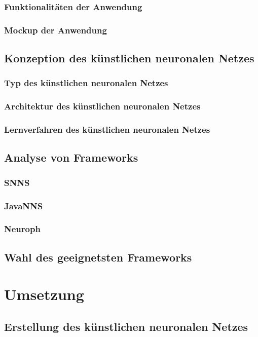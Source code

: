 \documentclass[11pt,a4paper]{scrreprt}
\begin{document}
		\subsection{Funktionalitäten der Anwendung} %
		\subsection{Mockup der Anwendung} %
	\section{Konzeption des künstlichen neuronalen Netzes} %
		\subsection{Typ des künstlichen neuronalen Netzes} %
		\subsection{Architektur des künstlichen neuronalen Netzes} %
		\subsection{Lernverfahren des künstlichen neuronalen Netzes} %
	\section{Analyse von Frameworks} %
		\subsection{SNNS} %
	  \subsection{JavaNNS}  %
		\subsection{Neuroph} %
	\section{Wahl des geeignetsten Frameworks} %
	
\chapter{Umsetzung} %
	\section{Erstellung des künstlichen neuronalen Netzes} %
\end{document}
